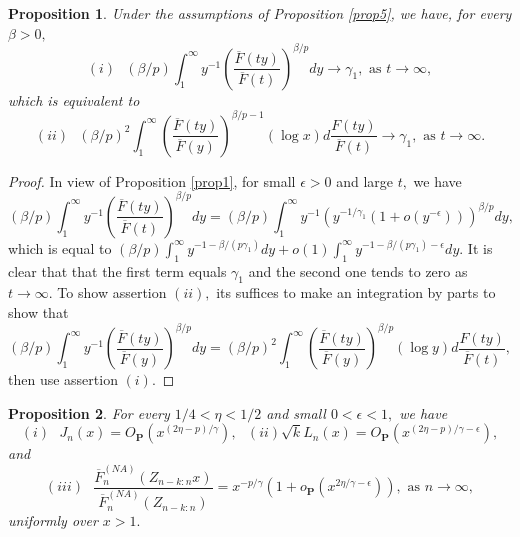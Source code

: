 \documentclass[reqno,openbib,runningheads,a4paper,12pt]{amsart}%
\newtheorem{proposition}{Proposition}[section]
\begin{document}
\begin{proposition}
\textbf{\label{prop2}}Under the assumptions of Proposition \ref{prop5}, we
have, for every $\beta>0,$%
\[
\left(  i\right)  \text{ }\left(  \beta/p\right)  \int_{1}^{\infty}%
y^{-1}\left(  \frac{\overline{F}\left(  ty\right)  }{\overline{F}\left(
t\right)  }\right)  ^{\beta/p}dy\rightarrow\gamma_{1},\text{ as }%
t\rightarrow\infty,
\]
which is equivalent to%
\[
\left(  ii\right)  \text{ }\left(  \beta/p\right)  ^{2}\int_{1}^{\infty
}\left(  \frac{\overline{F}\left(  ty\right)  }{\overline{F}\left(  y\right)
}\right)  ^{\beta/p-1}\left(  \log x\right)  d\frac{F\left(  ty\right)
}{\overline{F}\left(  t\right)  }\rightarrow\gamma_{1},\text{ as }%
t\rightarrow\infty.
\]

\end{proposition}

\begin{proof}
In view of Proposition \ref{prop1}, for small $\epsilon>0$ and large $t,$ we
have%
\[
\left(  \beta/p\right)  \int_{1}^{\infty}y^{-1}\left(  \frac{\overline
{F}\left(  ty\right)  }{\overline{F}\left(  t\right)  }\right)  ^{\beta
/p}dy=\left(  \beta/p\right)  \int_{1}^{\infty}y^{-1}\left(  y^{-1/\gamma_{1}%
}\left(  1+o\left(  y^{-\epsilon}\right)  \right)  \right)  ^{\beta/p}dy,
\]
which is equal to $\left(  \beta/p\right)  \int_{1}^{\infty}y^{-1-\beta
/\left(  p\gamma_{1}\right)  }dy+o\left(  1\right)  \int_{1}^{\infty
}y^{-1-\beta/\left(  p\gamma_{1}\right)  -\epsilon}dy.$ It is clear that that
the first term equals $\gamma_{1}$ and the second one tends to zero as
$t\rightarrow\infty.$ To show assertion $\left(  ii\right)  ,$ its suffices to
make an integration by parts to show that%
\[
\left(  \beta/p\right)  \int_{1}^{\infty}y^{-1}\left(  \frac{\overline
{F}\left(  ty\right)  }{\overline{F}\left(  y\right)  }\right)  ^{\beta
/p}dy=\left(  \beta/p\right)  ^{2}\int_{1}^{\infty}\left(  \frac{\overline
{F}\left(  ty\right)  }{\overline{F}\left(  y\right)  }\right)  ^{\beta
/p}\left(  \log y\right)  d\frac{F\left(  ty\right)  }{\overline{F}\left(
t\right)  },
\]
then use assertion $\left(  i\right)  $.
\end{proof}

\begin{proposition}
\textbf{\label{prop3}}For every $1/4<\eta<1/2$ and small $0<\epsilon<1,$ we
have%
\[
\left(  i\right)  \text{ }J_{n}\left(  x\right)  =O_{\mathbf{P}}\left(
x^{\left(  2\eta-p\right)  /\gamma}\right)  ,\text{ }\left(  ii\right)  \text{
}\sqrt{k}L_{n}\left(  x\right)  =O_{\mathbf{P}}\left(  x^{\left(
2\eta-p\right)  /\gamma-\epsilon}\right)  ,
\]
and%
\[
\left(  iii\right)  \text{ }\frac{\overline{F}_{n}^{\left(  NA\right)
}\left(  Z_{n-k:n}x\right)  }{\overline{F}_{n}^{\left(  NA\right)  }\left(
Z_{n-k:n}\right)  }=x^{-p/\gamma}\left(  1+o_{\mathbf{P}}\left(
x^{2\eta/\gamma-\epsilon}\right)  \right)  ,\text{ as }n\rightarrow\infty,
\]
uniformly over $x>1.$
\end{proposition}
\end{document}
